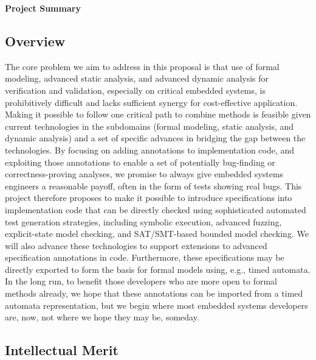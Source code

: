 \documentclass[11pt]{article}
\begin{document}

\begin{center}
  \large\bfseries
  Project Summary
\end{center}

\subsection*{Overview}

The core problem we aim to address in this proposal is that use of formal modeling, advanced static analysis, and advanced dynamic analysis for verification and validation, especially on critical embedded systems, is prohibitively difficult and lacks sufficient synergy for cost-effective application. Making it possible to follow one critical path to combine methods is feasible given current technologies in the subdomains (formal modeling, static analysis, and dynamic analysis) and a set of specific advances in bridging the gap between the technologies. By focusing on adding annotations to implementation code, and exploiting those annotations to enable a set of potentially bug-finding or correctness-proving analyses, we promise to always give embedded systems engineers a reasonable payoff, often in the form of tests showing real bugs. This project therefore proposes to make it possible to introduce specifications into implementation code that can be directly checked using sophisticated automated test generation strategies, including symbolic execution, advanced fuzzing, explicit-state model checking, and SAT/SMT-based bounded model checking. We will also advance these technologies %
to support extensions to advanced specification annotations in code. Furthermore, these specifications may be directly exported to form the basis for formal models using, e.g., timed automata. In the long run, to benefit those developers who are more open to formal methods already, we hope that these annotations can be imported from a timed automata representation, but we begin where most embedded systems developers are, now, not where we hope they may be, someday.

\subsection*{Intellectual Merit}
\end{document}

